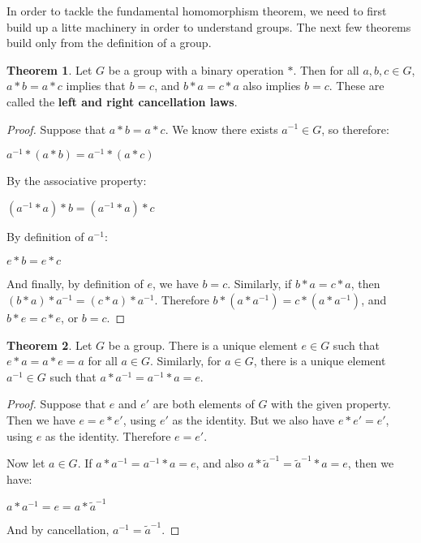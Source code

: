 \documentclass{article}
\newcommand{\inv}[1]{#1^{-1}}
\theoremstyle{definition}
\newtheorem{theorem}{Theorem}[section]
\newenvironment{thm}
{\theoremstyle{definition}
\begin{theorem}}
{\end{theorem}}
\begin{document}
In order to tackle the fundamental homomorphism theorem, we need to first build up a litte machinery in order to understand groups. The next few theorems build only from the definition of a group.

\begin{thm}
Let $G$ be a group with a binary operation $*$. Then for all $a, b, c \in G$, $a * b = a * c$ implies that $b = c$, and $b*a = c*a$ also implies $b=c$. These are called the \textbf{left and right cancellation laws}.
\end{thm}

\begin{proof}
Suppose that $a*b = a*c$. We know there exists $\inv{a} \in G$, so therefore:

\begin{center}
    $\inv{a} * (a*b) = \inv{a} * (a*c)$
\end{center}

By the associative property:

\begin{center}
    $(\inv{a} * a) * b = (\inv{a} * a) * c$
\end{center}

By definition of $\inv{a}$:

\begin{center}
    $e * b = e * c$
\end{center}

And finally, by definition of $e$, we have $b = c$. Similarly, if $b*a = c*a$, then $(b*a)*\inv{a} = (c*a)*\inv{a}$. Therefore $b*(a*\inv{a}) = c*(a*\inv{a})$, and $b*e = c*e$, or $b = c$.

\end{proof}

\begin{thm}
Let $G$ be a group. There is a unique element $e \in G$ such that $e*a = a*e = a$ for all $a \in G$. Similarly, for $a \in G$, there is a unique element $\inv{a} \in G$ such that $a*\inv{a} = \inv{a}*a = e$.
\end{thm}

\begin{proof}
Suppose that $e$ and $e'$ are both elements of $G$ with the given property. Then we have $e = e*e'$, using $e'$ as the identity. But we also have $e*e' = e'$, using $e$ as the identity. Therefore $e = e'$.

Now let $a \in G$. If $a*\inv{a} = \inv{a}*a = e$, and also $a*\inv{\tilde{a}} = \inv{\tilde{a}}*a = e$, then we have:

\begin{center}
    $a*\inv{a} = e = a*{\inv{\tilde{a}}}$
\end{center}

And by cancellation, $\inv{a} = \inv{\tilde{a}}$.

\end{proof}
\end{document}
